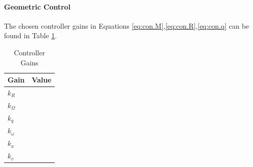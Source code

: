 
\paragraph{Geometric Control}
The chosen controller gains in Equations \ref{eq:con.M},\ref{eq:con.R},\ref{eq:con.q} can be found in Table \ref{tab:set.gains}.

\begin{table}[h!]
	\centering
	\begin{tabular}{|l|l|}
		\hline
		\textbf{Gain}&\textbf{Value}\\
		\hline
		$ k_R $&\\
		$ k_\Omega $&\\
		$ k_q $&\\
		$ k_\omega $&\\
		$ k_x $&\\
		$ k_v $&\\	
		\hline
	\end{tabular}
	\caption{Controller Gains}
	\label{tab:set.gains}
\end{table}

